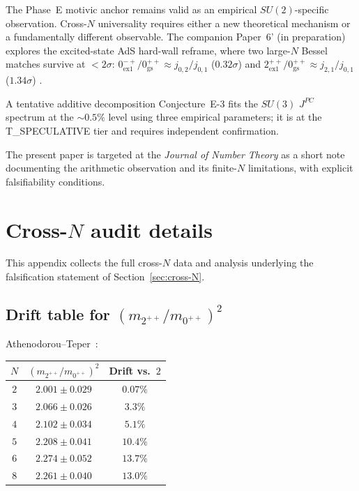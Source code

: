 \documentclass[11pt,a4paper]{amsart}
\theoremstyle{definition}
\begin{document}
The Phase~E motivic anchor remains valid as an empirical $SU(2)$-specific
observation. Cross-$N$ universality requires either a new theoretical mechanism
or a fundamentally different observable. The companion Paper~6' (in preparation)
explores the excited-state AdS hard-wall reframe, where two large-$N$ Bessel
matches survive at $<2\sigma$: $0^{-+}_{\mathrm{ex1}}/0^{++}_{\mathrm{gs}}
\approx j_{0,2}/j_{0,1}$ ($0.32\sigma$) and $2^{++}_{\mathrm{ex1}}/0^{++}_{\mathrm{gs}}
\approx j_{2,1}/j_{0,1}$ ($1.34\sigma$) \cite{Brower2000}.

A tentative additive decomposition Conjecture~E-3 fits the $SU(3)$ $J^{PC}$
spectrum at the $\sim 0.5\%$ level using three empirical parameters; it is at
the T\_SPECULATIVE tier and requires independent confirmation.

The present paper is targeted at the \emph{Journal of Number Theory} as a
short note documenting the arithmetic observation and its finite-$N$ limitations,
with explicit falsifiability conditions.

\appendix

\section{Cross-$N$ audit details}\label{app:crossN}

This appendix collects the full cross-$N$ data and analysis underlying the
falsification statement of Section~\ref{sec:cross-N}.

\subsection{Drift table for $(m_{2^{++}}/m_{0^{++}})^{2}$}

Athenodorou--Teper~\cite[Table~34]{AthenodorouTeper2021}:
\begin{center}
\begin{tabular}{ccc}
\toprule
$N$ & $(m_{2^{++}}/m_{0^{++}})^{2}$ & Drift vs.\ $2$ \\
\midrule
$2$ & $2.001 \pm 0.029$ & $0.07\%$ \\
$3$ & $2.066 \pm 0.026$ & $3.3\%$ \\
$4$ & $2.102 \pm 0.034$ & $5.1\%$ \\
$5$ & $2.208 \pm 0.041$ & $10.4\%$ \\
$6$ & $2.274 \pm 0.052$ & $13.7\%$ \\
$8$ & $2.261 \pm 0.040$ & $13.0\%$ \\
\bottomrule
\end{tabular}
\end{center}
\end{document}
